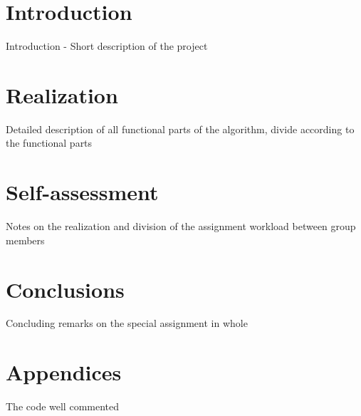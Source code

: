 \documentclass[10pt,a4paper,oneside]{article}
\begin{document}
\maketitle

\section{Introduction}

\cite{LaTeXhomepage}

Introduction - Short description of the project


\section{Realization}

Detailed description of all functional parts of the algorithm, divide according to the functional parts


\section{Self-assessment}

Notes on the realization and division of the assignment workload between group members


\section{Conclusions}

Concluding remarks on the special assignment in whole


\section{Appendices}

The code well commented



\end{document}
